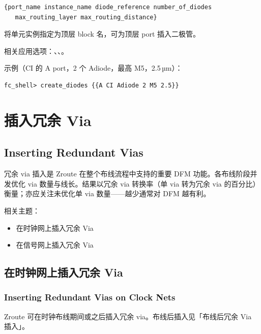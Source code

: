 \begin{lstlisting}
{port_name instance_name diode_reference number_of_diodes
   max_routing_layer max_routing_distance}
\end{lstlisting}

\begin{noteBox}
将单元实例指定为顶层 block 名，可为顶层 port 插入二极管。
\end{noteBox}

相关应用选项：、、。

示例（CI 的 A port，2 个 Adiode，最高 M5，2.5\,µm）：
\begin{lstlisting}
fc_shell> create_diodes {{A CI Adiode 2 M5 2.5}}
\end{lstlisting}

\section{插入冗余 Via}
\subsection*{Inserting Redundant Vias}

冗余 via 插入是 Zroute 在整个布线流程中支持的重要 DFM 功能。各布线阶段并发优化 via 数量与线长。结果以冗余 via 转换率（单 via 转为冗余 via 的百分比）衡量；亦应关注未优化单 via 数量——越少通常对 DFM 越有利。

相关主题：
\begin{itemize}
  \item 在时钟网上插入冗余 Via
  \item 在信号网上插入冗余 Via
\end{itemize}

\subsection{在时钟网上插入冗余 Via}
\subsubsection*{Inserting Redundant Vias on Clock Nets}

Zroute 可在时钟布线期间或之后插入冗余 via。布线后插入见「布线后冗余 Via 插入」。

